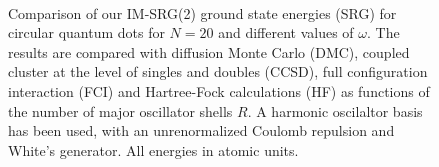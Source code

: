 \documentclass[amsmath, amssymb, aps, floatfix, nofootinbib, preprintnumbers,showpacs, superscriptaddress, twocolumn]{revtex4-1}
\begin{document}
\begin{figure}%
     \begin{center}
         \\ %
         
    \end{center}
    \caption{Comparison of our IM-SRG(2) ground state energies (SRG)
      for circular quantum dots for $N=20$ and different values of
      $\omega$. The results are compared with diffusion Monte
      Carlo (DMC), coupled cluster at the level of singles and doubles
      (CCSD), full configuration interaction (FCI) and Hartree-Fock
      calculations (HF) as functions of the number of major oscillator
      shells $R$. A harmonic oscilaltor basis has been used, with an
      unrenormalized Coulomb repulsion and White's generator. All
      energies in atomic units.}
   \label{fig:N20}
\end{figure}
\end{document}
